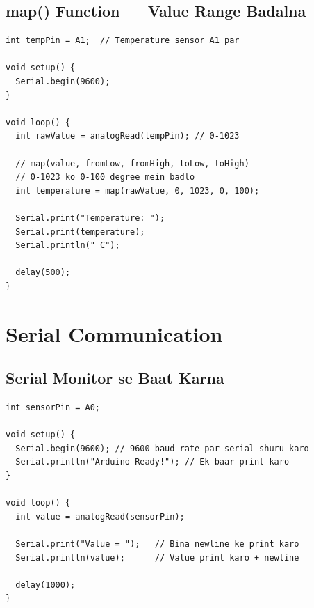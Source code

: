 \documentclass[12pt,a4paper]{article}
\begin{document}
\subsection{map() Function — Value Range Badalna}

\begin{tcolorbox}[codebox=Example 6: map() se Temperature Display]
\begin{lstlisting}
int tempPin = A1;  // Temperature sensor A1 par

void setup() {
  Serial.begin(9600);
}

void loop() {
  int rawValue = analogRead(tempPin); // 0-1023

  // map(value, fromLow, fromHigh, toLow, toHigh)
  // 0-1023 ko 0-100 degree mein badlo
  int temperature = map(rawValue, 0, 1023, 0, 100);

  Serial.print("Temperature: ");
  Serial.print(temperature);
  Serial.println(" C");

  delay(500);
}
\end{lstlisting}
\end{tcolorbox}

\newpage

\section{Serial Communication}

\subsection{Serial Monitor se Baat Karna}

\begin{tcolorbox}[codebox=Example 7: Serial Monitor par Data Print Karna]
\begin{lstlisting}
int sensorPin = A0;

void setup() {
  Serial.begin(9600); // 9600 baud rate par serial shuru karo
  Serial.println("Arduino Ready!"); // Ek baar print karo
}

void loop() {
  int value = analogRead(sensorPin);

  Serial.print("Value = ");   // Bina newline ke print karo
  Serial.println(value);      // Value print karo + newline

  delay(1000);
}
\end{lstlisting}
\end{tcolorbox}
\end{document}
